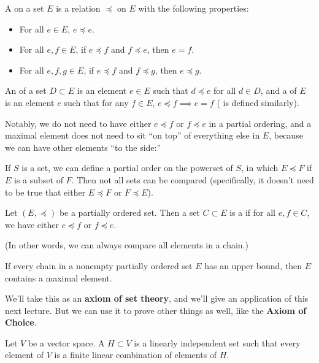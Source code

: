 \begin{definition}
A  on a set $E$ is a relation $\preceq$ on $E$ with the following properties:
\begin{itemize}
\item For all $e \in E$, $e \preceq e$.
\item For all $e, f \in E$, if $e \preceq f$ and $f \preceq e$, then $e = f$.
\item For all $e, f, g \in E$, if $e \preceq f$ and $f \preceq g$, then $e \preceq g$.
\end{itemize}
An  of a set $D \subset E$ is an element $e \in E$ such that $d \preceq e$ for all $d \in D$, and a  of $E$ is an element $e$ such that for any $f \in E$, $e \preceq f \implies e = f$ ( is defined similarly).
\end{definition}

Notably, we do not need to have either $e \preceq f$ or $f \preceq e$ in a partial ordering, and a maximal element does not need to sit ``on top'' of everything else in $E$, because we can have other elements ``to the side:''

\begin{example}
If $S$ is a set, we can define a partial order on the powerset of $S$, in which $E \preceq F$ if $E$ is a subset of $F$. Then not all sets can be compared (specifically, it doesn't need to be true that either $E \preceq F$ or $F \preceq E$).
\end{example}

\begin{definition}
Let $(E, \preceq)$ be a partially ordered set. Then a set $C \subset E$ is a  if for all $e, f \in C$, we have either $e \preceq f$ or $f \preceq e$.
\end{definition}

(In other words, we can always compare all elements in a chain.)

\begin{proposition}
If every chain in a nonempty partially ordered set $E$ has an upper bound, then $E$ contains a maximal element.
\end{proposition}

We'll take this as an \textbf{axiom of set theory}, and we'll give an application of this next lecture. But we can use it to prove other things as well, like the \textbf{Axiom of Choice}.

\begin{definition}
Let $V$ be a vector space. A  $H \subset V$ is a linearly independent set such that every element of $V$ is a finite linear combination of elements of $H$. 
\end{definition}

